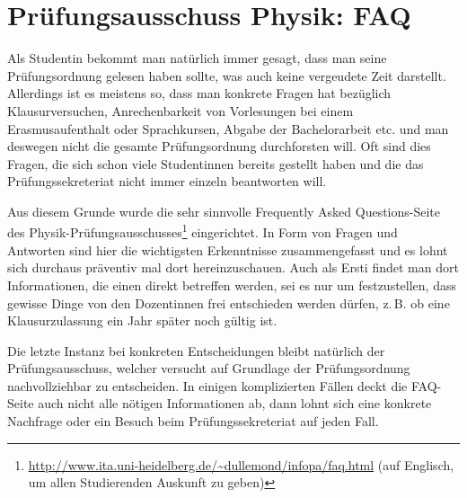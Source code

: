 \section{Prüfungsausschuss Physik: FAQ}
Als Studentin bekommt man natürlich immer gesagt, dass man seine Prüfungsordnung gelesen haben sollte, was auch keine vergeudete Zeit darstellt. Allerdings ist es meistens so, dass man konkrete Fragen hat bezüglich Klausurversuchen, Anrechenbarkeit von Vorlesungen bei einem Erasmusaufenthalt oder Sprachkursen, Abgabe der Bachelorarbeit etc. und man deswegen nicht die gesamte Prüfungsordnung durchforsten will. Oft sind dies Fragen, die sich schon viele Studentinnen bereits gestellt haben und die das Prüfungssekreteriat nicht immer einzeln beantworten will. 

Aus diesem Grunde wurde die sehr sinnvolle Frequently Asked Questions-Seite des Physik-Prüfungsausschusses\footnote{\url{http://www.ita.uni-heidelberg.de/~dullemond/infopa/faq.html} (auf Englisch, um allen Studierenden Auskunft zu geben)} eingerichtet. In Form von Fragen und Antworten sind hier die wichtigsten Erkenntnisse zusammengefasst und es lohnt sich durchaus präventiv mal dort hereinzuschauen. Auch als Ersti findet man dort Informationen, die einen direkt betreffen werden, sei es nur um festzustellen, dass gewisse Dinge von den Dozentinnen frei entschieden werden dürfen, z.\,B. ob eine Klausurzulassung ein Jahr später noch gültig ist.

Die letzte Instanz bei konkreten Entscheidungen bleibt natürlich der Prüfungsausschuss, welcher versucht auf Grundlage der Prüfungsordnung nachvollziehbar zu entscheiden. In einigen komplizierten Fällen deckt die FAQ-Seite auch nicht alle nötigen Informationen ab, dann lohnt sich eine konkrete Nachfrage oder ein Besuch beim Prüfungssekreteriat auf jeden Fall.
